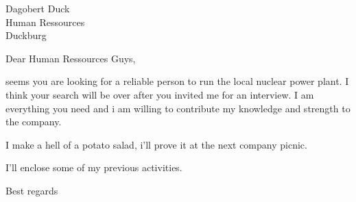 \documentclass[parskip=half]{bewerbung}
\begin{document}
\begin{letter}{Dagobert Duck\\
		Human Ressources\\
	Duckburg}
	\opening{Dear Human Ressources Guys,}

	seems you are looking for a reliable person to run the
	local nuclear power plant. I think your search will be
	over after you invited me for an interview. I am
	 everything you need and i am willing to contribute my
	knowledge and strength to the company. 

	I make a hell of a potato salad, i'll prove it at
	the next company picnic.

	I'll enclose some of my previous activities.

	\closing{Best regards}
\end{letter}
\end{document}

